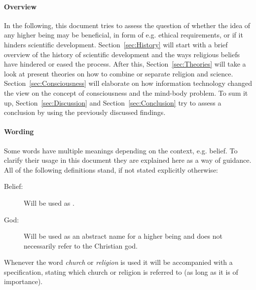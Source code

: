 \paragraph{Overview}
In the following, this document tries to assess the question of whether the idea of any higher being may be beneficial, in form of e.g. ethical requirements, or if it hinders scientific development.
Section~\ref{sec:History} will start with a brief overview of the history of scientific development and the ways religious beliefs have hindered or eased the process.
After this, Section~\ref{sec:Theories} will take a look at present theories on how to combine or separate religion and science.
Section~\ref{sec:Consciousness} will elaborate on how information technology changed the view on the concept of consciousness and the mind-body problem.
To sum it up, Section~\ref{sec:Discussion} and Section~\ref{sec:Conclusion} try to assess a conclusion by using the previously discussed findings.

\paragraph{Wording}
Some words have multiple meanings depending on the context, e.g. belief.
To clarify their usage in this document they are explained here as a way of guidance.
All of the following definitions stand, if not stated explicitly otherwise:
\begin{description}
    \item[Belief:] Will be used as .
    \item[God:] Will be used as an abstract name for a higher being and does not necessarily refer to the Christian god.
\end{description}
Whenever the word \emph{church} or \emph{religion} is used it will be accompanied with a specification, stating which church or religion is referred to (as long as it is of importance).
